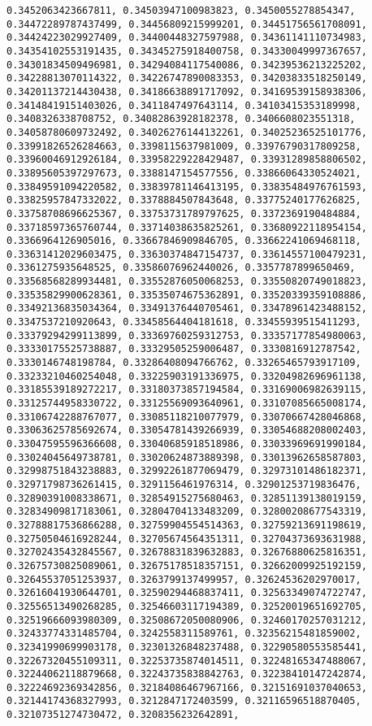 \documentclass[11pt]{article}
\begin{document}
\begin{Verbatim}[commandchars=\\\{\}]
0.3452063423667811, 0.34503947100983823, 0.3450055278854347, 0.34472289787437499, 0.34456809215999201, 0.34451756561708091, 0.34424223029927409, 0.34400448327597988, 0.34361141110734983, 0.34354102553191435, 0.34345275918400758, 0.34330049997367657, 0.34301834509496981, 0.34294084117540086, 0.34239536213225202, 0.34228813070114322, 0.34226747890083353, 0.34203833518250149, 0.34201137214430438, 0.34186638891717092, 0.34169539158938306, 0.34148419151403026, 0.3411847497643114, 0.34103415353189998, 0.3408326338708752, 0.34082863928182378, 0.3406608023551318, 0.34058780609732492, 0.34026276144132261, 0.34025236525101776, 0.33991826526284663, 0.3398115637981009, 0.33976790317809258, 0.33960046912926184, 0.33958229228429487, 0.33931289858806502, 0.33895605397297673, 0.3388147154577556, 0.33866064330524021, 0.33849591094220582, 0.33839781146413195, 0.33835484976761593, 0.33825957847332022, 0.3378884507843648, 0.33775240177626825, 0.33758708696625367, 0.33753731789797625, 0.3372369190484884, 0.33718597365760744, 0.33714038635825261, 0.33680922118954154, 0.3366964126905016, 0.33667846909846705, 0.33662241069468118, 0.33631412029603475, 0.33630374847154737, 0.33614557100479231, 0.3361275935648525, 0.33586076962440026, 0.3357787899650469, 0.33568568289934481, 0.33552876050068253, 0.33550820749018823, 0.33535829900628361, 0.33535074675362891, 0.33520339359108886, 0.33492136835034364, 0.33491376440705461, 0.33478961423488152, 0.3347537210920643, 0.33458564404181618, 0.33455939515411293, 0.33379294299113899, 0.33369760259312753, 0.33357177854980063, 0.33330175525738887, 0.33329505259006487, 0.3330816912787542, 0.3330146748198784, 0.33286408094766762, 0.33265465793917109, 0.33233210460254048, 0.33225903191336975, 0.33204982696961138, 0.33185539189272217, 0.33180373857194584, 0.33169006982639115, 0.33125744958330722, 0.33125569093640961, 0.33107085665008174, 0.33106742288767077, 0.33085118210077979, 0.33070667428046868, 0.33063625785692674, 0.33054781439266939, 0.33054688208002403, 0.33047595596366608, 0.33040685918518986, 0.33033969691990184, 0.33024045649738781, 0.33020624873889398, 0.33013962658587803, 0.32998751843238883, 0.32992261877069479, 0.32973101486182371, 0.32971798736261415, 0.3291156461976314, 0.32901253719836476, 0.32890391008338671, 0.32854915275680463, 0.32851139138019159, 0.32834909817183061, 0.32804704133483209, 0.32800208677543319, 0.32788817536866288, 0.32759904554514363, 0.32759213691198619, 0.32750504616928244, 0.32705674564351311, 0.32704373693631988, 0.32702435432845567, 0.32678831839632883, 0.32676880625816351, 0.32675730825089061, 0.32675178518357151, 0.32662009925192159, 0.32645537051253937, 0.3263799137499957, 0.32624536202970017, 0.32616041930644701, 0.32590294468837411, 0.32563349074722747, 0.32556513490268285, 0.32546603117194389, 0.32520019651692705, 0.32519666093980309, 0.32508672050080906, 0.32460170257031212, 0.32433774331485704, 0.3242558311589761, 0.32356215481859002, 0.32341990699903178, 0.32301326848237488, 0.32290580553585441, 0.32267320455109311, 0.32253735874014511, 0.32248165347488067, 0.32244062118879668, 0.32243735838842763, 0.32238410147242874, 0.32224692369342856, 0.32184086467967166, 0.32151691037040653, 0.32144174368327993, 0.3212847172403599, 0.32116596518870405, 0.32107351274730472, 0.3208356232642891, 
\end{Verbatim}
\end{document}
